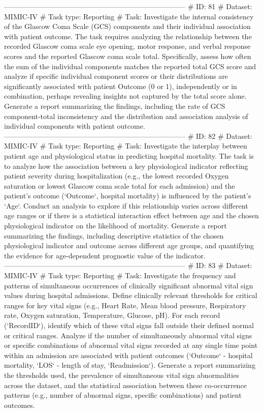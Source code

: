 \begin{tcolorbox}[colback=cadmiumgreen!5!white,colframe=forestgreen!75!white,breakable,title=\textit{Generated analytical tasks in task 4.}]
\begin{VerbatimWrap}
-----------------------------------------------------------------------------
# ID: 81  
# Dataset: MIMIC-IV 
# Task type: Reporting
# Task: Investigate the internal consistency of the Glascow Coma Scale (GCS) components and their individual association with patient outcome. The task requires analyzing the relationship between the recorded Glascow coma scale eye opening, motor response, and verbal response scores and the reported Glascow coma scale total. Specifically, assess how often the sum of the individual components matches the reported total GCS score and analyze if specific individual component scores or their distributions are significantly associated with patient Outcome (0 or 1), independently or in combination, perhaps revealing insights not captured by the total score alone. Generate a report summarizing the findings, including the rate of GCS component-total inconsistency and the distribution and association analysis of individual components with patient outcome.
-----------------------------------------------------------------------------
# ID: 82  
# Dataset: MIMIC-IV 
# Task type: Reporting
# Task: Investigate the interplay between patient age and physiological status in predicting hospital mortality. The task is to analyze how the association between a key physiological indicator reflecting patient severity during hospitalization (e.g., the lowest recorded Oxygen saturation or lowest Glascow coma scale total for each admission) and the patient's outcome (`Outcome`, hospital mortality) is influenced by the patient's `Age`. Conduct an analysis to explore if this relationship varies across different age ranges or if there is a statistical interaction effect between age and the chosen physiological indicator on the likelihood of mortality. Generate a report summarizing the findings, including descriptive statistics of the chosen physiological indicator and outcome across different age groups, and quantifying the evidence for age-dependent prognostic value of the indicator.
-----------------------------------------------------------------------------
# ID: 83  
# Dataset: MIMIC-IV 
# Task type: Reporting
# Task: Investigate the frequency and patterns of simultaneous occurrences of clinically significant abnormal vital sign values during hospital admissions. Define clinically relevant thresholds for critical ranges for key vital signs (e.g., Heart Rate, Mean blood pressure, Respiratory rate, Oxygen saturation, Temperature, Glucose, pH). For each record (`RecordID`), identify which of these vital signs fall outside their defined normal or critical ranges. Analyze if the number of simultaneously abnormal vital signs or specific combinations of abnormal vital signs recorded at any single time point within an admission are associated with patient outcomes (`Outcome` - hospital mortality, `LOS` - length of stay, `Readmission`). Generate a report summarizing the thresholds used, the prevalence of simultaneous vital sign abnormalities across the dataset, and the statistical association between these co-occurrence patterns (e.g., number of abnormal signs, specific combinations) and patient outcomes.

\end{VerbatimWrap}
\end{tcolorbox}
